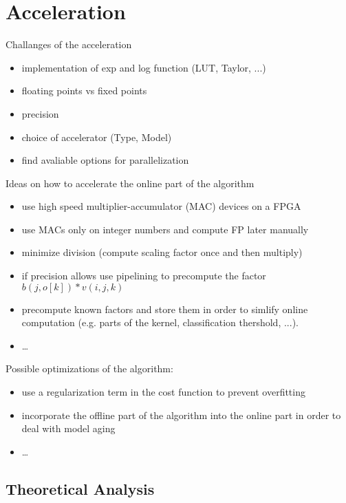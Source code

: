 \documentclass[mscthesis]{usiinfthesis}
\begin{document}
\chapter{Acceleration}
Challanges of the acceleration
\begin{itemize}
    \item implementation of exp and log function (LUT, Taylor, ...)
    \item floating points vs fixed points
    \item precision
    \item choice of accelerator (Type, Model)
    \item find avaliable options for parallelization
\end{itemize}

Ideas on how to accelerate the online part of the algorithm
\begin{itemize}
    \item use high speed multiplier-accumulator (MAC) devices on a FPGA
    \item use MACs only on integer numbers and compute FP later manually
    \item minimize division (compute scaling factor once and then multiply)
    \item if precision allows use pipelining to precompute the factor
        $ b(j, o[k]) * v(i, j, k) $
    \item precompute known factors and store them in order to simlify online
        computation (e.g. parts of the kernel, classification thershold, ...).
    \item \dots
\end{itemize}

Possible optimizations of the algorithm:
\begin{itemize}
    \item use a regularization term in the cost function to prevent overfitting
    \item incorporate the offline part of the algorithm into the online part in
        order to deal with model aging
    \item \dots
\end{itemize}

\section{Theoretical Analysis}
\end{document}
